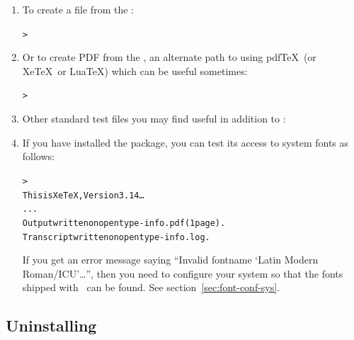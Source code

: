 \documentclass[12pt]{article}
\begin{document}
\begin{enumerate}
\item To create a \PS{} file from the \dvi:
\begin{alltt}
> 
\end{alltt}

\item Or to create PDF from the \dvi{}, an alternate path to using
pdf\TeX\ (or Xe\TeX\ or Lua\TeX) which can be useful sometimes:
\begin{alltt}
> 
\end{alltt}

\item Other standard test files you may find useful in addition to
:


\item If you have installed the  package, you can test
its access to system fonts as follows:
\begin{alltt}
> 
This is XeTeX, Version 3.14\dots
...
Output written on opentype-info.pdf (1 page).
Transcript written on opentype-info.log.
\end{alltt}

If you get an error message saying ``Invalid fontname `Latin Modern
Roman/ICU'\dots'', then you need to configure your system so that the
fonts shipped with \TL\ can be found.  See
section~\ref{sec:font-conf-sys}.

\end{enumerate}

\subsection{Uninstalling \TL}
\label{sec:uninstall}
\end{document}
